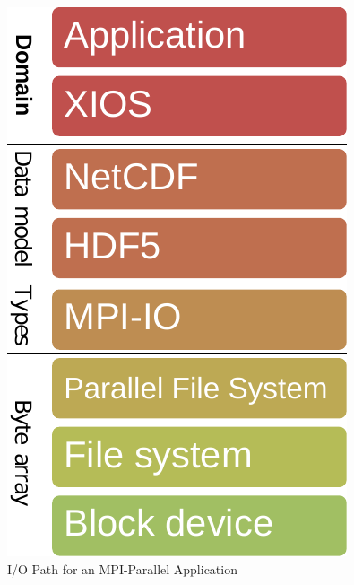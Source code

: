 \documentclass[a4paper]{article}
\begin{document}
\begin{minipage}{0.2\textwidth}
\begin{figure}[H]
  \includegraphics[width=\textwidth]{layers-xios}
  \caption{I/O Path for an MPI-Parallel Application}
  \label{fig:layers}
\end{figure}
\end{minipage}
\qquad
\end{document}
